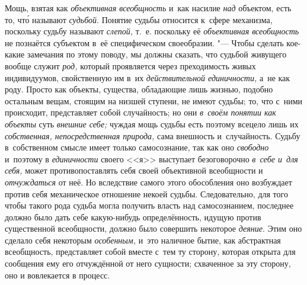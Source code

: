 Мощь, взятая как
{\em объективная всеобщность}
и~как насилие {\em над}
объектом, есть то, чт\'{о} называют
{\em судьбой}. Понятие
судьбы относится к~сфере механизма, поскольку судьбу называют
{\em слепой,} т.~е.
поскольку её {\em объективная
всеобщность} не познаётся субъектом в~её специфическом
своеобразии. "--- Чтобы сделать кое-какие замечания
по этому поводу, мы должны сказать, что судьбой живущего вообще служит
{\em род,} который
проявляется через преходимость живых индивидуумов, свойственную им в~их
{\em действительной единичности,}
а~не как роду. Просто как объекты, существа, обладающие лишь
жизнью, подобно остальным вещам, стоящим на низшей ступени, не имеют
судьбы; то, что с~ними происходит, представляет собой случайность; но они
{\em в~своём понятии как объекты}
суть {\em внешние себе;}
чуждая мощь судьбы есть поэтому всецело лишь их
{\em собственная, непосредственная
природа,} сама внешность и~случайность. Судьбу в~собственном
смысле имеет только самосознание, так как оно
{\em свободно} и~поэтому
в {\em единичности}
своего <<я>> выступает безоговорочно
{\em в~себе и~для себя,}
может противопоставлять себя своей объективной всеобщности и
{\em отчуждаться} от неё.
Но вследствие самого этого обособления оно возбуждает против
себя механическое отношение некоей судьбы. Следовательно, для того чтобы
такого рода судьба могла получить власть над самосознанием, последнее
должно было дать себе какую-нибудь определённость, идущую против
существенной всеобщности, должно было совершить некоторое
{\em деяние}. Этим оно
сделало себя некоторым {\em особенным,}
и~это наличное бытие, как абстрактная всеобщность,
представляет собой вместе с~тем ту сторону, которая открыта для сообщения
ему его отчуждённой от него сущности; схваченное за эту сторону, оно и
вовлекается в
процесс.
